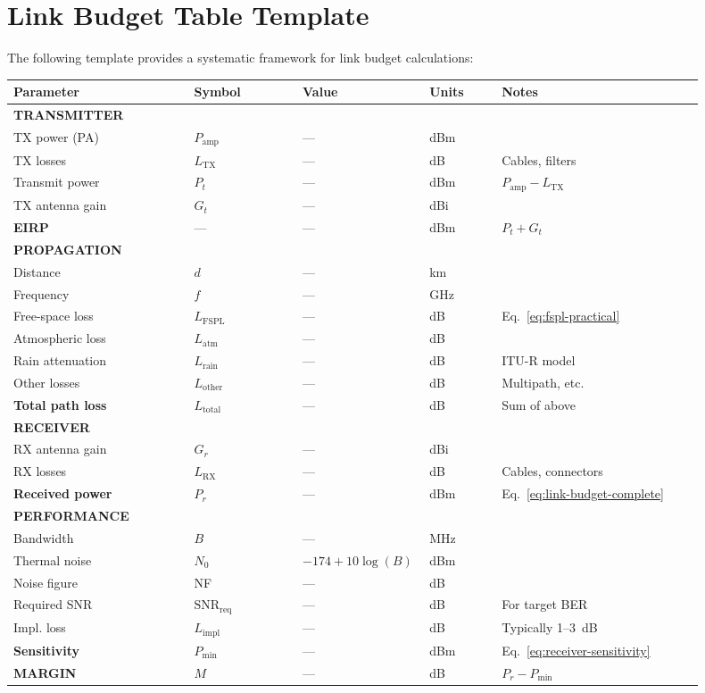 \section{Link Budget Table Template}

The following template provides a systematic framework for link budget calculations:

\begin{center}
\begin{tabular}{@{}p{0.25\linewidth}p{0.15\linewidth}p{0.12\linewidth}p{0.10\linewidth}p{0.28\linewidth}@{}}
\toprule
\textbf{Parameter} & \textbf{Symbol} & \textbf{Value} & \textbf{Units} & \textbf{Notes} \\
\midrule
\multicolumn{5}{l}{\textbf{TRANSMITTER}} \\
TX power (PA) & $P_{\text{amp}}$ & --- & dBm & \\
TX losses & $L_{\text{TX}}$ & --- & dB & Cables, filters \\
Transmit power & $P_t$ & --- & dBm & $P_{\text{amp}} - L_{\text{TX}}$ \\
TX antenna gain & $G_t$ & --- & dBi & \\
\textbf{EIRP} & --- & --- & dBm & $P_t + G_t$ \\
\midrule
\multicolumn{5}{l}{\textbf{PROPAGATION}} \\
Distance & $d$ & --- & km & \\
Frequency & $f$ & --- & GHz & \\
Free-space loss & $L_{\text{FSPL}}$ & --- & dB & Eq.~\ref{eq:fspl-practical} \\
Atmospheric loss & $L_{\text{atm}}$ & --- & dB & \\
Rain attenuation & $L_{\text{rain}}$ & --- & dB & ITU-R model \\
Other losses & $L_{\text{other}}$ & --- & dB & Multipath, etc. \\
\textbf{Total path loss} & $L_{\text{total}}$ & --- & dB & Sum of above \\
\midrule
\multicolumn{5}{l}{\textbf{RECEIVER}} \\
RX antenna gain & $G_r$ & --- & dBi & \\
RX losses & $L_{\text{RX}}$ & --- & dB & Cables, connectors \\
\textbf{Received power} & $P_r$ & --- & dBm & Eq.~\ref{eq:link-budget-complete} \\
\midrule
\multicolumn{5}{l}{\textbf{PERFORMANCE}} \\
Bandwidth & $B$ & --- & MHz & \\
Thermal noise & $N_0$ & $-174 + 10\log(B)$ & dBm & \\
Noise figure & NF & --- & dB & \\
Required SNR & $\text{SNR}_{\text{req}}$ & --- & dB & For target BER \\
Impl. loss & $L_{\text{impl}}$ & --- & dB & Typically 1--3~dB \\
\textbf{Sensitivity} & $P_{\text{min}}$ & --- & dBm & Eq.~\ref{eq:receiver-sensitivity} \\
\midrule
\textbf{MARGIN} & $M$ & --- & dB & $P_r - P_{\text{min}}$ \\
\bottomrule
\end{tabular}
\end{center}

